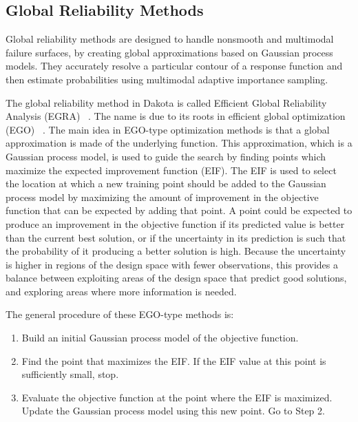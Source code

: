 \subsection{Global Reliability Methods}\label{uq:reliability:global}

Global reliability methods are designed to handle nonsmooth and
multimodal failure surfaces, by creating global approximations based
on Gaussian process models. They accurately resolve a particular
contour of a response function and then estimate probabilities using
multimodal adaptive importance sampling.

The global reliability method in Dakota is called 
Efficient Global Reliability Analysis (EGRA) ~\cite{Bic07}. 
The name is due to its 
roots in efficient global optimization (EGO) ~\cite{Jon98,Hua06}.
The main idea in EGO-type optimization methods is that a global 
approximation is made of the underlying function. This approximation, 
which is a Gaussian process model, is used to guide the search by finding 
points which maximize the expected improvement function (EIF). 
The EIF is used to select the location at which a new training point should be
added to the Gaussian process model by maximizing the amount of improvement 
in the objective function that can be expected by adding that point.
A point could be expected to produce an improvement in the objective function 
if its predicted value is better than the current best solution, or if the 
uncertainty in its prediction is such that the probability of it producing
a better solution is high.
Because the uncertainty is higher in regions of the design space with fewer
observations, this provides a balance between exploiting areas of the
design space that predict good solutions, and exploring areas where more
information is needed.

The general procedure of these EGO-type methods is:
\begin{enumerate}
\item Build an initial Gaussian process model of the objective function.
\item Find the point that maximizes the EIF.
      If the EIF value at this point is sufficiently small, stop.
\item Evaluate the objective function at the point where the EIF is maximized.
      Update the Gaussian process model using this new point.
      Go to Step 2.
\end{enumerate}

